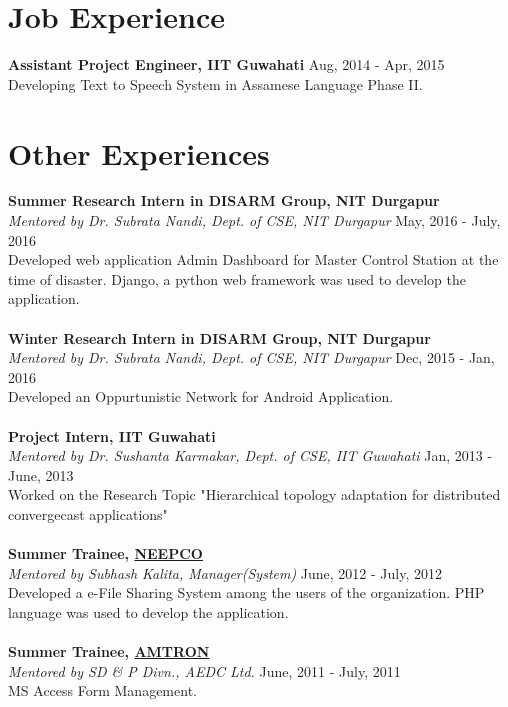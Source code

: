 \documentclass[margin, centered]{res}
\begin{document}
\begin{resume}
\section{Job Experience}
\textbf{Assistant Project Engineer, IIT Guwahati} \hfill Aug, 2014 - Apr, 2015\\
Developing Text to Speech System in Assamese Language Phase II. \\

\section{Other Experiences}
\textbf{Summer Research Intern in DISARM Group, NIT Durgapur} \\
\emph{Mentored by {Dr. Subrata Nandi, Dept. of CSE, NIT Durgapur}} \hfill May, 2016 - July, 2016 \\
Developed web application Admin Dashboard for Master Control Station at the time of disaster. Django, a python web framework was used to develop the application.\\
\\
\textbf{Winter Research Intern in DISARM Group, NIT Durgapur} \\
\emph{Mentored by {Dr. Subrata Nandi, Dept. of CSE, NIT Durgapur}} \hfill Dec, 2015 - Jan, 2016 \\
Developed an Oppurtunistic Network for Android Application.
\\
\\
\textbf{Project Intern, IIT Guwahati}  \\
\emph{Mentored by {Dr. Sushanta Karmakar, Dept. of CSE, IIT Guwahati}} \hfill Jan, 2013 - June, 2013 \\
Worked on the Research Topic "Hierarchical topology adaptation for distributed convergecast applications"
\\
\\
\textbf{Summer Trainee, \href{http://neepco.co.in/neepco/}{NEEPCO}} \\
\emph{Mentored by {Subhash Kalita, Manager(System)}} \hfill June, 2012 - July, 2012 \\
Developed a e-File Sharing System among the users of the organization. PHP language was used to develop the application.
\\
\\
\textbf{Summer Trainee, \href{http://amtron.in/}{AMTRON}}  \\
\emph{Mentored by {SD \& P Divn., AEDC Ltd.}} \hfill June, 2011 - July, 2011 \\
MS Access Form Management.
\\
\\


\end{resume}
\end{document}

